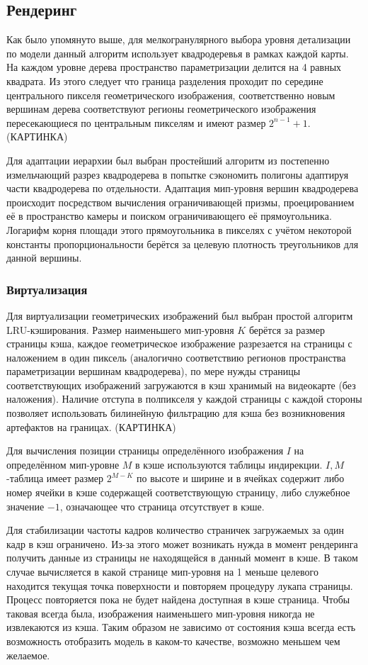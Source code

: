 \documentclass[12pt]{extarticle}
\begin{document}
\subsection{Рендеринг}
Как было упомянуто выше, для мелкогранулярного выбора уровня детализации по модели данный алгоритм использует квадродеревья в рамках каждой карты. На каждом уровне дерева пространство параметризации делится на 4 равных квадрата. Из этого следует что граница разделения проходит по середине центрального пикселя геометрического изображения, соответственно новым вершинам дерева соответствуют регионы геометрического изображения пересекающиеся по центральным пикселям и имеют размер $2^{n-1} + 1$. (КАРТИНКА)

Для адаптации иерархии был выбран простейший алгоритм из \cite{niski2007multi} постепенно измельчающий разрез квадродерева в попытке сэкономить полигоны адаптируя части квадродерева по отдельности. Адаптация мип-уровня вершин квадродерева происходит посредством вычисления ограничивающей призмы, проецированием её в пространство камеры и поиском ограничивающего её прямоугольника. Логарифм корня площади этого прямоугольника в пикселях с учётом некоторой константы пропорциональности берётся за целевую плотность треугольников для данной вершины.


\subsubsection{Виртуализация}
Для виртуализации геометрических изображений был выбран простой алгоритм LRU-кэширования. Размер наименьшего мип-уровня $K$ берётся за размер страницы кэша, каждое геометрическое изображение разрезается на страницы с наложением в один пиксель (аналогично соответствию регионов пространства параметризации вершинам квадродерева), по мере нужды страницы соответствующих изображений загружаются в кэш хранимый на видеокарте (без наложения). Наличие отступа в полпикселя у каждой страницы с каждой стороны позволяет использовать билинейную фильтрацию для кэша без возникновения артефактов на границах. (КАРТИНКА)

Для вычисления позиции страницы определённого изображения $I$ на определённом мип-уровне $M$ в кэше используются таблицы индирекции. $I,M$-таблица имеет размер $2^{M - K}$ по высоте и ширине и в ячейках содержит либо номер ячейки в кэше содержащей соответствующую страницу, либо служебное значение $-1$, означающее что страница отсутствует в кэше.

Для стабилизации частоты кадров количество страничек загружаемых за один кадр в кэш ограничено. Из-за этого может возникать нужда в момент рендеринга получить данные из страницы не находящейся в данный момент в кэше. В таком случае вычисляется в какой странице мип-уровня на 1 меньше целевого находится текущая точка поверхности и повторяем процедуру лукапа страницы. Процесс повторяется пока не будет найдена доступная в кэше страница. Чтобы таковая всегда была, изображения наименьшего мип-уровня никогда не извлекаются из кэша. Таким образом не зависимо от состояния кэша всегда есть возможность отобразить модель в каком-то качестве, возможно меньшем чем желаемое.
\end{document}
